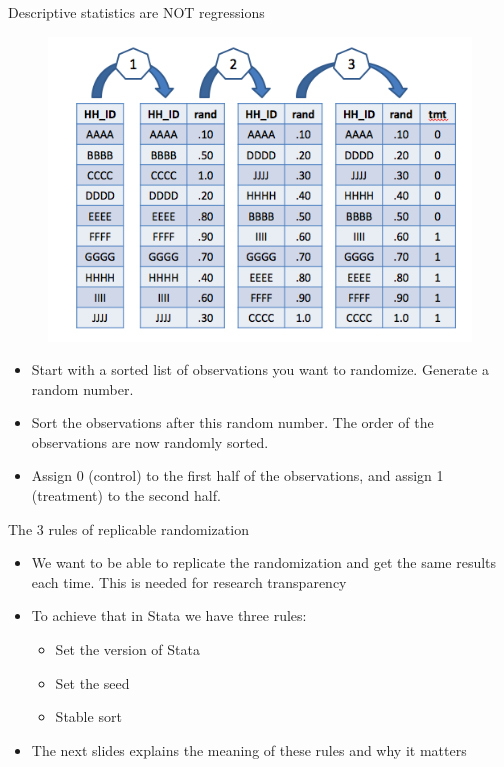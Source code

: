 \documentclass[aspectratio=169]{beamer}
\begin{document}
\begin{frame}[fragile]{Descriptive statistics are NOT regressions}
\begin{multicols}{2}	
		\begin{figure}
		\centering
		\includegraphics[width=\linewidth]{img/randomeg1}
	\end{figure}

	\begin{itemize}
		\item Start with a sorted list of observations you want to randomize. Generate a random number.
		\item Sort the observations after this random number. The order of the observations are now randomly sorted.
		\item Assign 0 (control) to the first half of the observations, and assign 1 (treatment) to the second half.		
	\end{itemize}
\end{multicols}
\end{frame}


\begin{frame}{The 3 rules of replicable randomization}
\begin{itemize}
	\item We want to be able to replicate the randomization and get the same results each time. This is needed for research transparency
	\item To achieve that in Stata we have three rules:
		\begin{itemize}
			\item Set the version of Stata
			\item Set the seed 
			\item Stable sort
		\end{itemize}
	\item The next slides explains the meaning of these rules and why it matters
\end{itemize}
\end{frame}
\end{document}
